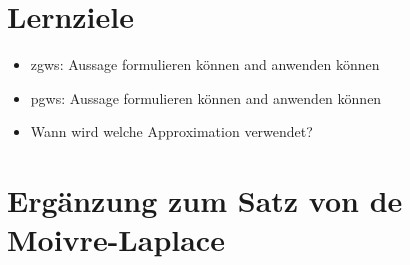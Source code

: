 


\section*{Lernziele}
\begin{itemize}
    \item \gls{zgws}:
    Aussage formulieren können and anwenden können
    \item \gls{pgws}:
    Aussage formulieren können and anwenden können
    \item Wann wird welche Approximation verwendet?
\end{itemize}

\section*{Ergänzung zum Satz von de Moivre-Laplace}

